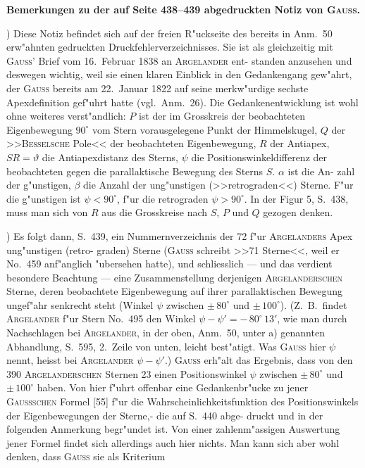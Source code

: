 \documentclass[12pt,a4paper]{article}
\theoremstyle{plain}
\theoremstyle{definition}
\theoremstyle{remark}
\begin{document}
\textbf{Bemerkungen zu der auf Seite 438--439 abgedruckten Notiz von \textsc{Gauss}.}

\smallskip{}) Diese Notiz befindet sich auf der freien R"uckseite des bereits in Anm.~50 erw"ahnten gedruckten
Druckfehlerverzeichnisses. Sie ist als gleichzeitig mit \textsc{Gauss}' Brief vom 16.~Februar 1838 an \textsc{Argelander} ent-
standen anzusehen und deswegen wichtig, weil sie einen klaren Einblick in den Gedankengang gew"ahrt,
der \textsc{Gauss} bereits am 22.~Januar 1822 auf seine merkw"urdige sechste Apexdefinition gef"uhrt hatte (vgl.\ Anm.~26). Die Gedankenentwicklung ist wohl ohne weiteres verst"andlich: $P$ ist der im Grosskreis der
beobachteten Eigenbewegung $90^\circ$ vom Stern vorausgelegene Punkt der Himmelskugel, $Q$ der >>\textsc{Besselsche}
Pole<< der beobachteten Eigenbewegung, $R$ der Antiapex, $SR = \vartheta$ die Antiapexdistanz des Sterns, $\psi$ die
Positionswinkeldifferenz der beobachteten gegen die parallaktische Bewegung des Sterns $S$. $\alpha$ ist die An-
zahl der g"unstigen, $\beta$ die Anzahl der ung"unstigen (>>retrograden<<) Sterne. F"ur die g"unstigen ist $\psi < 90^\circ$,
f"ur die retrograden $\psi > 90^\circ$. In der Figur 5, S.~438, muss man sich von $R$ aus die Grosskreise nach $S$, $P$
und $Q$ gezogen denken.

\smallskip{}) Es folgt dann, S.~439, ein Nummernverzeichnis der 72 f"ur \textsc{Argelanders} Apex ung"unstigen (retro-
graden) Sterne (\textsc{Gauss} schreibt >>71 Sterne<<, weil er No.~459 anf"anglich "ubersehen hatte), und schliesslich ---
und das verdient besondere Beachtung --- eine Zusammenstellung derjenigen \textsc{Argelanderschen} Sterne, deren
beobachtete Eigenbewegung auf ihrer parallaktischen Bewegung ungef"ahr senkrecht steht (Winkel $\psi$ zwischen
$\pm\,80^\circ$ und $\pm\,100^\circ$). (Z.\ B.\ findet \textsc{Argelander} f"ur Stern No.~495 den Winkel $\psi - \psi' = -\,80^\circ\,13'$, wie man
durch Nachschlagen bei \textsc{Argelander}, in der oben, Anm.~50, unter a) genannten Abhandlung, S.~595,
2.~Zeile von unten, leicht best"atigt. Was \textsc{Gauss} hier $\psi$ nennt, heisst bei \textsc{Argelander} $\psi - \psi'$.) \textsc{Gauss} erh"alt
das Ergebnis, dass von den 390 \textsc{Argelanderschen} Sternen 23 einen Positionswinkel $\psi$ zwischen $\pm\,80^\circ$ und
$\pm\,100^\circ$ haben. Von hier f"uhrt offenbar eine Gedankenbr"ucke zu jener \textsc{Gaussschen} Formel [55] f"ur die
Wahrscheinlichkeitsfunktion des Positionswinkels der Eigenbewegungen der Sterne,- die auf S.~440 abge-
druckt und in der folgenden Anmerkung begr"undet ist. Von einer zahlenm"assigen Auswertung jener Formel
findet sich allerdings auch hier nichts. Man kann sich aber wohl denken, dass \textsc{Gauss} sie als Kriterium
\end{document}
